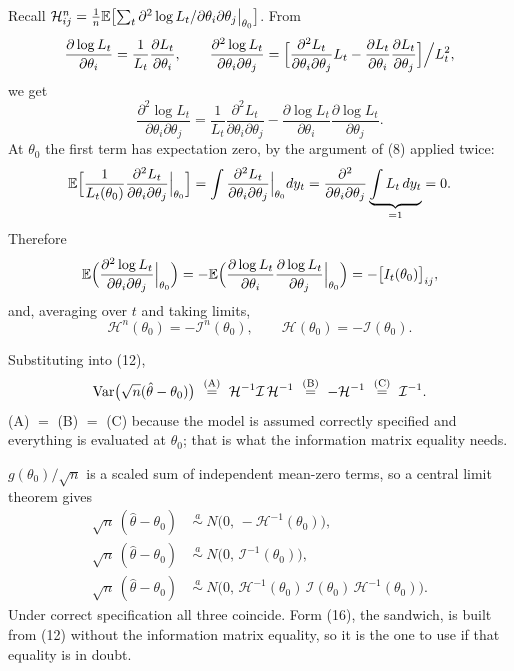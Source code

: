 \documentclass[11pt]{article}
\begin{document}
Recall $\mathcal H^{n}_{ij}=\frac1n\mathbb{E}\bigl[\sum_{t}\partial^{2}\log L_{t}/\partial\theta_{i}\partial\theta_{j}\big|_{\theta_{0}}\bigr]$. From
\[ \frac{\partial\log L_{t}}{\partial\theta_{i}}=\frac{1}{L_{t}}\frac{\partial L_{t}}{\partial\theta_{i}},
   \qquad
   \frac{\partial^{2}\log L_{t}}{\partial\theta_{i}\partial\theta_{j}}
   =\Bigl[\frac{\partial^{2}L_{t}}{\partial\theta_{i}\partial\theta_{j}}L_{t}
     -\frac{\partial L_{t}}{\partial\theta_{i}}\frac{\partial L_{t}}{\partial\theta_{j}}\Bigr]\Big/L_{t}^{2}, \]
we get
\begin{equation}\tag{13}
 \frac{\partial^{2}\log L_{t}}{\partial\theta_{i}\partial\theta_{j}}
 =\frac{1}{L_{t}}\frac{\partial^{2}L_{t}}{\partial\theta_{i}\partial\theta_{j}}
  -\frac{\partial\log L_{t}}{\partial\theta_{i}}\frac{\partial\log L_{t}}{\partial\theta_{j}} .
\end{equation}
At $\theta_{0}$ the first term has expectation zero, by the argument of (8) applied twice:
\[ \mathbb{E}\Bigl[\frac{1}{L_{t}(\theta_{0})}\frac{\partial^{2}L_{t}}{\partial\theta_{i}\partial\theta_{j}}\Big|_{\theta_{0}}\Bigr]
   =\int\frac{\partial^{2}L_{t}}{\partial\theta_{i}\partial\theta_{j}}\Big|_{\theta_{0}}dy_{t}
   =\frac{\partial^{2}}{\partial\theta_{i}\partial\theta_{j}}\underbrace{\int L_{t}\,dy_{t}}_{=1}=0 . \]
Therefore
\[ \mathbb{E}\Bigl(\frac{\partial^{2}\log L_{t}}{\partial\theta_{i}\partial\theta_{j}}\Big|_{\theta_{0}}\Bigr)
   =-\mathbb{E}\Bigl(\frac{\partial\log L_{t}}{\partial\theta_{i}}\frac{\partial\log L_{t}}{\partial\theta_{j}}\Big|_{\theta_{0}}\Bigr)
   =-\bigl[I_{t}(\theta_{0})\bigr]_{ij}, \]
and, averaging over $t$ and taking limits,
\[ \mathcal H^{n}(\theta_{0})=-\mathcal I^{n}(\theta_{0}), \qquad \mathcal H(\theta_{0})=-\mathcal I(\theta_{0}). \]

Substituting into (12),
\[ \operatorname{Var}\bigl(\sqrt n(\hat\theta-\theta_{0})\bigr)
   \ \overset{\text{(A)}}{=}\ \mathcal H^{-1}\mathcal I\,\mathcal H^{-1}
   \ \overset{\text{(B)}}{=}\ -\mathcal H^{-1}
   \ \overset{\text{(C)}}{=}\ \mathcal I^{-1}. \]
(A) $=$ (B) $=$ (C) because the model is assumed correctly specified and everything is
evaluated at $\theta_{0}$; that is what the information matrix equality needs.

$g(\theta_{0})/\sqrt n$ is a scaled sum of independent mean-zero terms, so a central limit theorem
gives
\begin{align*}
 \sqrt n\,(\hat\theta-\theta_{0}) &\ \overset{a}{\sim}\ N\bigl(0,\,-\mathcal H^{-1}(\theta_{0})\bigr), \tag{14}\\
 \sqrt n\,(\hat\theta-\theta_{0}) &\ \overset{a}{\sim}\ N\bigl(0,\,\mathcal I^{-1}(\theta_{0})\bigr), \tag{15}\\
 \sqrt n\,(\hat\theta-\theta_{0}) &\ \overset{a}{\sim}\ N\bigl(0,\,\mathcal H^{-1}(\theta_{0})\,\mathcal I(\theta_{0})\,\mathcal H^{-1}(\theta_{0})\bigr). \tag{16}
\end{align*}
Under correct specification all three coincide. Form (16), the sandwich, is built from
(12) without the information matrix equality, so it is the one to use if that equality
is in doubt.
\end{document}

